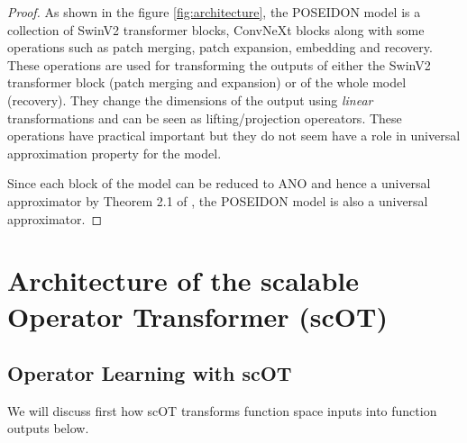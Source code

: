 \documentclass[reqno,10pt]{amsart}
\theoremstyle{plain}
\theoremstyle{definition}
\begin{document}
\begin{proof}
    As shown in the figure \ref{fig:architecture}, the POSEIDON model is a collection of SwinV2 transformer blocks, ConvNeXt blocks along with some operations such as patch merging, patch expansion, embedding and recovery. These operations are used for transforming the outputs of either the SwinV2 transformer block (patch merging and expansion) or of the whole model (recovery). They change the dimensions of the output using {\it linear} transformations and can be seen as lifting/projection opereators. These operations have practical important but they do not seem have a role in universal approximation property for the model.

    \noindent Since each block of the model can be reduced to ANO and hence a universal approximator by Theorem 2.1 of \cite{SL2024}, the POSEIDON model is also a universal approximator.
\end{proof}


\appendix
\section{\bf Architecture of the scalable Operator Transformer (scOT)}
\subsection{Operator Learning with scOT}
We will discuss first how scOT transforms function space inputs into function outputs below.
\end{document}
